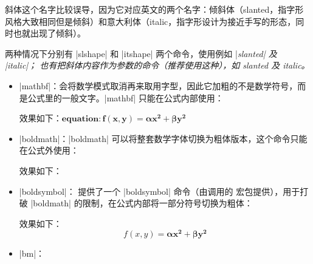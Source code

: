 斜体这个名字比较误导，因为它对应英文的两个名字：倾斜体（slanted，指字形风格大致相同但是倾斜）和意大利体（italic，指字形设计为接近手写的形态，同时也就出现了倾斜）。

两种情况下分别有 |slshape| 和 |itshape| 两个命令，使用例如 |\slshape slanted| 及 |\itshape italic|；
也有把斜体内容作为参数的命令（推荐使用这种），如 \textsl{slanted} 及 \textit{italic}。



\begin{itemize}
  \item |mathbf|：会将数学模式取消再来取用字型，因此它加粗的不是数学符号，而是公式里的一般文字。|mathbf| 只能在公式内部使用： 
  效果如下：$  $
  \item |boldmath|：|boldmath| 可以将整套数学字体切换为粗体版本，这个命令只能在公式外使用：
  效果如下：
  \item |boldsymbol|： 提供了一个 |boldsymbol| 命令（由调用的  宏包提供），用于打破 |boldmath| 的限制，在公式内部将一部分符号切换为粗体：
  效果如下：
  \[ f(x,y) =  \]
  \item |bm|：
\end{itemize}
